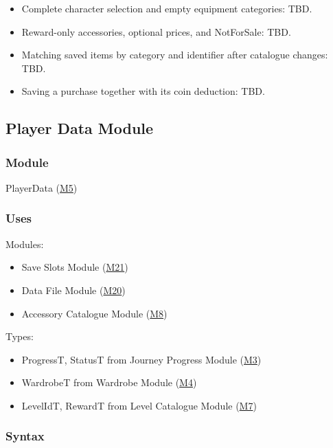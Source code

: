\documentclass[10pt, titlepage]{article}
\newcommand{\misref}[2]{\hyperref[mis:#1]{M#2}}
\begin{document}
\begin{itemize}
\item Complete character selection and empty equipment categories: TBD.
\item Reward-only accessories, optional prices, and NotForSale: TBD.
\item Matching saved items by category and identifier after catalogue changes: TBD.
\item Saving a purchase together with its coin deduction: TBD.
\end{itemize}

\newpage
\subsection{Player Data Module} \label{mis:PlayerData}

\subsubsection{Module}

PlayerData (\misref{PlayerData}{5})

\subsubsection{Uses}

Modules:
\begin{itemize}
\item Save Slots Module (\misref{Slots}{21})
\item Data File Module (\misref{DataFile}{20})
\item Accessory Catalogue Module (\misref{Accessories}{8})
\end{itemize}

Types:
\begin{itemize}
\item ProgressT, StatusT from Journey Progress Module (\misref{Progress}{3})
\item WardrobeT from Wardrobe Module (\misref{Wardrobe}{4})
\item LevelIdT, RewardT from Level Catalogue Module (\misref{Levels}{7})
\end{itemize}

\subsubsection{Syntax}
\end{document}
